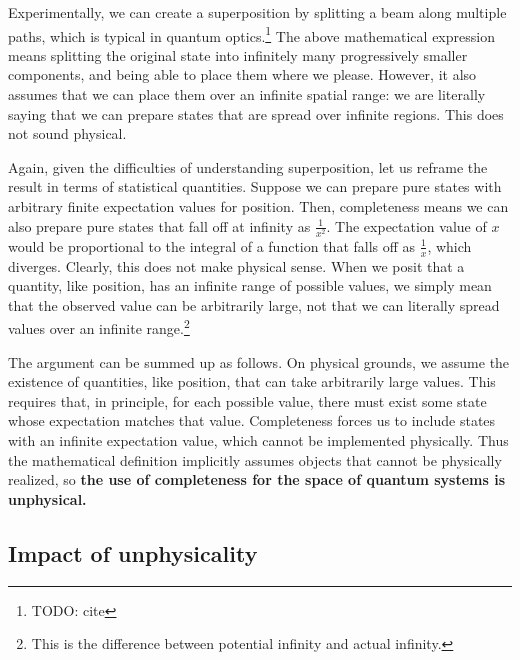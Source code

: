 \documentclass[10pt,twocolumn, nofootinbib]{revtex4-2}
\begin{document}
Experimentally, we can create a superposition by splitting a beam along multiple paths, which is typical in quantum optics.\footnote{TODO: cite} The above mathematical expression means splitting the original state into infinitely many progressively smaller components, and being able to place them where we please. However, it also assumes that we can place them over an infinite spatial range: we are literally saying that we can prepare states that are spread over infinite regions. This does not sound physical.

Again, given the difficulties of understanding superposition, let us reframe the result in terms of statistical quantities. Suppose we can prepare pure states with arbitrary finite expectation values for position. Then, completeness means we can also prepare pure states that fall off at infinity as $\frac{1}{x^2}$. The expectation value of $x$ would be proportional to the integral of a function that falls off as $\frac{1}{x}$, which diverges. Clearly, this does not make physical sense. When we posit that a quantity, like position, has an infinite range of possible values, we simply mean that the observed value can be arbitrarily large, not that we can literally spread values over an infinite range.\footnote{This is the difference between potential infinity and actual infinity.}


The argument can be summed up as follows. On physical grounds, we assume the existence of quantities, like position, that can take arbitrarily large values. This requires that, in principle, for each possible value, there must exist some state whose expectation matches that value. Completeness forces us to include states with an infinite expectation value, which cannot be implemented physically. Thus the mathematical definition implicitly assumes objects that cannot be physically realized, so \textbf{the use of completeness for the space of quantum systems is unphysical.}

\subsection{Impact of unphysicality}
\end{document}
